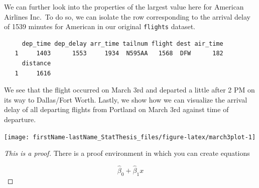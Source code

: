 \documentclass[12pt, twoside]{amherstthesis}
\newenvironment{Shaded}{\begin{snugshade}}{\end{snugshade}}
\newcommand{\DataTypeTok}[1]{\textcolor[rgb]{0.13,0.29,0.53}{#1}}
\newcommand{\DecValTok}[1]{\textcolor[rgb]{0.00,0.00,0.81}{#1}}
\newcommand{\KeywordTok}[1]{\textcolor[rgb]{0.13,0.29,0.53}{\textbf{#1}}}
\newcommand{\NormalTok}[1]{#1}
\newcommand{\OperatorTok}[1]{\textcolor[rgb]{0.81,0.36,0.00}{\textbf{#1}}}
\newcommand{\StringTok}[1]{\textcolor[rgb]{0.31,0.60,0.02}{#1}}
\theoremstyle{definition}
\theoremstyle{definition}
\theoremstyle{definition}
\theoremstyle{remark}
\begin{document}
We can further look into the properties of the largest value here for American Airlines Inc.~To do so, we can isolate the row corresponding to the arrival delay of 1539 minutes for American in our original \texttt{flights} dataset.
\begin{Shaded}
\end{Shaded}
\begin{verbatim}
     dep_time dep_delay arr_time tailnum flight dest air_time
   1     1403      1553     1934  N595AA   1568  DFW      182
     distance
   1     1616
\end{verbatim}
We see that the flight occurred on March 3rd and departed a little after 2 PM on its way to Dallas/Fort Worth. Lastly, we show how we can visualize the arrival delay of all departing flights from Portland on March 3rd against time of departure.
\begin{Shaded}
\end{Shaded}
\begin{center}\texttt{[image: firstName-lastName\_StatThesis\_files/figure-latex/march3plot-1]} \end{center}
\begin{proof}[This is a proof]
{}There is a proof environment in which you can create equations

\[
\hat{\beta}_0 + \hat{\beta}_1x
\]
\end{proof}
\end{document}
